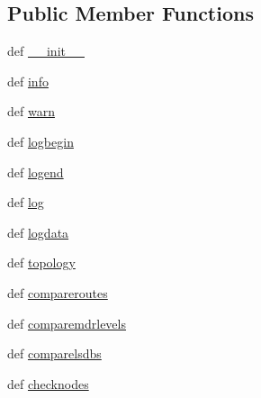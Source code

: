 \subsection*{Public Member Functions}
\begin{DoxyCompactItemize}
\item 
def \hyperlink{classospfmanetmdrtest_1_1_manet_experiment_a86840a57c5919451221b9ff760194b79}{\+\_\+\+\_\+init\+\_\+\+\_\+}
\item 
def \hyperlink{classospfmanetmdrtest_1_1_manet_experiment_a9878b9ff16f7360e444bd2e5c50da6d4}{info}
\item 
def \hyperlink{classospfmanetmdrtest_1_1_manet_experiment_a7793e5d9b37d8924f1416a02a7f6d452}{warn}
\item 
def \hyperlink{classospfmanetmdrtest_1_1_manet_experiment_a1a8bc39379975160bbd0d657edf01eaa}{logbegin}
\item 
def \hyperlink{classospfmanetmdrtest_1_1_manet_experiment_a38b4056e07971a0149702ab7f077d7fa}{logend}
\item 
def \hyperlink{classospfmanetmdrtest_1_1_manet_experiment_af78607e038d08172c67efd460221404e}{log}
\item 
def \hyperlink{classospfmanetmdrtest_1_1_manet_experiment_affd6abf49a0c6aeb6f65c7d8703f00f7}{logdata}
\item 
def \hyperlink{classospfmanetmdrtest_1_1_manet_experiment_a9fdfc88ca15ce1c618a752e32e5af32a}{topology}
\item 
def \hyperlink{classospfmanetmdrtest_1_1_manet_experiment_a0e191dbc326c072b0a0cce1fabdc1ea1}{compareroutes}
\item 
def \hyperlink{classospfmanetmdrtest_1_1_manet_experiment_afac07028a3d859f8ea6567a5c28a67de}{comparemdrlevels}
\item 
def \hyperlink{classospfmanetmdrtest_1_1_manet_experiment_a834869b808adf160bbdd789aff0b0026}{comparelsdbs}
\item 
def \hyperlink{classospfmanetmdrtest_1_1_manet_experiment_a14d1187fc4ce0fcf2be47a9405625412}{checknodes}
\end{DoxyCompactItemize}

